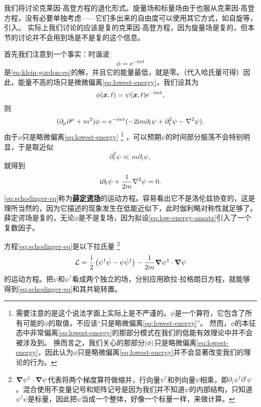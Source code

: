 \documentclass[hyperref, UTF8, a4paper]{ctexart}
\newcommand*{\ii}{\mathrm{i}}
\newcommand*{\ee}{\mathrm{e}}
\newcommand{\concept}[1]{\underline{\textbf{#1}}}
\begin{document}
我们将讨论克莱因-高登方程的退化形式。旋量场和标量场由于也服从克莱因-高登方程，没有必要单独考虑——它们多出来的自由度可以使用其它方式，如自旋等，引入。
实际上我们讨论的应该是复的克莱因-高登方程，因为旋量场是复的，但本节的讨论并不会用到场是不是复的这个信息。

首先我们注意到一个事实：时谐波
\begin{equation}
    \phi = \ee^{- \ii m t}
    \label{eq:lowest-energy}
\end{equation}
是\eqref{eq:klein-gordon-eq}的解，并且它的能量最低，就是零。（代入哈氏量可得）因此，能量不高的场只是微微偏离\eqref{eq:lowest-energy}，我们设其为
\begin{equation}
    \phi(\vb*{x}, t) = \psi(\vb*{x}, t) \ee^{- \ii m t},
    \label{eq:low-energy-ansatz}
\end{equation}
则
\[
    (\partial_\mu \partial^\mu + m^2) \phi = \ee^{- \ii m t} (-2 \ii m \partial_t \psi + \partial_t^2 \psi - \laplacian{\psi}).
\]
由于$\phi$只是略微偏离\eqref{eq:lowest-energy}%
\footnote{需要注意的是这个说法字面上实际上是不严谨的。${\phi}$是一个算符，它包含了所有可能的$\phi$的取值，不应该“只是略微偏离\eqref{eq:lowest-energy}”。
然而，${\phi}$的本征态中非常偏离\eqref{eq:lowest-energy}的那部分模式在我们的低能有效理论中并不会被涉及到。
换而言之，我们关心的那部分$\ket{\phi}$只是略微偏离\eqref{eq:lowest-energy}，因此认为${\phi}$只是略微偏离\eqref{eq:lowest-energy}并不会显著改变我们的理论的行为。
}%
，可以预期$\psi$的时间部分振荡不会特别明显，于是取近似
\[
    \partial_t^2 \psi \ll m \partial_t \psi,
\]
就得到
\begin{equation}
    \ii \partial_t \psi + \frac{1}{2m} \laplacian{\psi} = 0.
    \label{eq:schodinger-eq}
\end{equation}
\eqref{eq:schodinger-eq}称为\concept{薛定谔场}的运动方程。容易看出它不是洛伦兹协变的，这是理所当然的，因为它描述的现象发生在低能近似下，此时伽利略对称性就足够了。
薛定谔场是复的，无论$\phi$是不是复场，因为拟设\eqref{eq:low-energy-ansatz}引入了一个复数因子。

方程\eqref{eq:schodinger-eq}是以下拉氏量%
\footnote{$\grad{\psi}^\dagger \cdot \grad{\psi}$代表将两个梯度算符做缩并，行向量$\psi^\dagger$和列向量$\psi$相乘，即$\partial_i \psi^\dagger \partial^i \psi$。混合使用不变量记号和矩阵记号是因为我们并不知道$\psi$的内部结构，只知道$\psi^\dagger \psi$是标量，因此把$\psi$当成一个整体，好像一个标量一样，来做计算。}
\begin{equation}
    \mathcal{L} = \frac{\ii}{2} \left( \psi^\dagger \dot{\psi} - \psi \dot{\psi}^\dagger \right) - \frac{1}{2m} \grad{\psi^\dagger} \cdot \grad{\psi}
    \label{eq:schodinger-lagrangian}
\end{equation}
的运动方程。把$\psi$和$\psi^\dagger$看成两个独立的场，分别应用欧拉-拉格朗日方程，就能够得到\eqref{eq:schodinger-eq}和其共轭转置。
\end{document}
